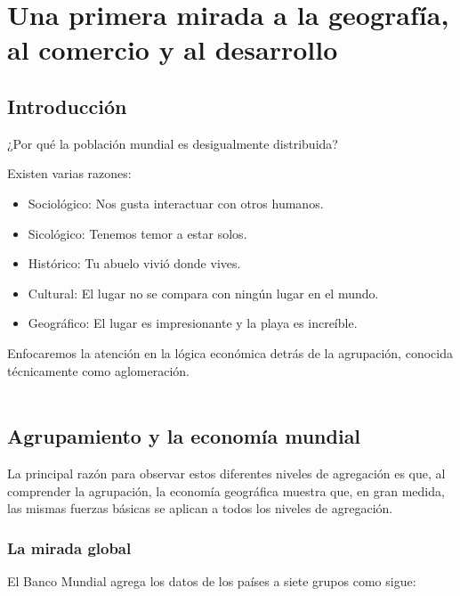 \chapter{Una primera mirada a la geografía, al comercio y al desarrollo}


\begin{multicols}{2}
\section{Introducción}

    \begin{center}
	¿Por qué la población mundial es desigualmente distribuida?
    \end{center}

    Existen varias razones:\\

    \begin{itemize}
	\item Sociológico: Nos gusta interactuar con otros humanos.
	\item Sicológico: Tenemos temor a estar solos.
	\item Histórico: Tu abuelo vivió donde vives. 
	\item Cultural: El lugar no se compara con ningún lugar en el mundo.
	\item Geográfico: El lugar es impresionante y la playa es increíble.\\
    \end{itemize}

    Enfocaremos la atención en la lógica económica detrás de la agrupación, conocida técnicamente como aglomeración.\\\\

\section{Agrupamiento y la economía mundial}
    La principal razón para observar estos diferentes niveles de agregación es que, al comprender la agrupación, la economía geográfica muestra que, en gran medida, las mismas fuerzas básicas se aplican a todos los niveles de agregación.

    \subsection{La mirada global}
    El Banco Mundial agrega los datos de los países a siete grupos como sigue:


\end{multicols}
